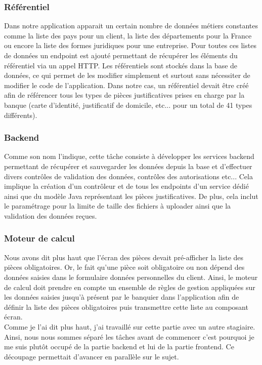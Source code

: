 	\subsubsection{Référentiel}
	Dans notre application apparait un certain nombre de données métiers constantes comme la liste des pays pour un client, la liste des départements pour la France ou encore la liste des formes juridiques pour une entreprise. Pour toutes ces listes de données un endpoint est ajouté permettant de récupérer les éléments du référentiel via un appel HTTP. Les référentiels sont stockés dans la base de données, ce qui permet de les modifier simplement et surtout sans nécessiter de modifier le code de l'application. Dans notre cas, un référentiel devait être créé afin de référencer tous les types de pièces justificatives prises en charge par la banque (carte d'identité, justificatif de domicile, etc... pour un total de 41 types différents).	
	
	\subsubsection{Backend}
	Comme son nom l'indique, cette tâche consiste à développer les services backend permettant de récupérer et sauvegarder les données depuis la base et d'effectuer divers contrôles de validation des données, contrôles des autorisations etc... Cela implique la création d'un contrôleur et de tous les endpoints d'un service dédié ainsi que du modèle Java représentant les pièces justificatives. De plus, cela inclut le paramétrage pour la limite de taille des fichiers à uploader ainsi que la validation des données reçues.
	
	\subsubsection{Moteur de calcul}
	Nous avons dit plus haut que l'écran des pièces devait pré-afficher la liste des pièces obligatoires. Or, le fait qu'une pièce soit obligatoire ou non dépend des données saisies dans le formulaire données personnelles du client. Ainsi, le moteur de calcul doit prendre en compte un ensemble de règles de gestion appliquées sur les données saisies jusqu'à présent par le banquier dans l'application afin de définir la liste des pièces obligatoires puis transmettre cette liste au composant écran. \\
	
	Comme je l'ai dit plus haut, j'ai travaillé sur cette partie avec un autre stagiaire. Ainsi, nous nous sommes séparé les tâches avant de commencer c'est pourquoi je me suis plutôt occupé de la partie backend et lui de la partie frontend. Ce découpage permettait d'avancer en parallèle sur le sujet. \\
	
